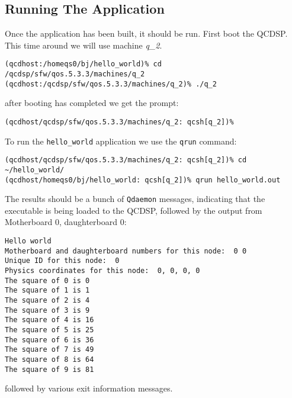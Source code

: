 \subsection{Running The Application}
Once the application has been built, it should be run.
First boot the QCDSP. This time around we will use machine {\em q\_2}.
\begin{verbatim}
(qcdhost:/homeqs0/bj/hello_world)% cd /qcdsp/sfw/qos.5.3.3/machines/q_2
(qcdhost:/qcdsp/sfw/qos.5.3.3/machines/q_2)% ./q_2
\end{verbatim}
after booting has completed we get the prompt:
\begin{verbatim}
(qcdhost/qcdsp/sfw/qos.5.3.3/machines/q_2: qcsh[q_2])% 
\end{verbatim}

To run the {\tt hello\_world} application we use the {\tt qrun} 
command:
\begin{verbatim}
(qcdhost/qcdsp/sfw/qos.5.3.3/machines/q_2: qcsh[q_2])% cd ~/hello_world/
(qcdhost/homeqs0/bj/hello_world: qcsh[q_2])% qrun hello_world.out
\end{verbatim}
The results should be a bunch of {\tt Qdaemon} messages,
indicating that the executable is being loaded to the 
QCDSP, followed by the output from Motherboard 0,
daughterboard 0:
\begin{verbatim}
Hello world
Motherboard and daughterboard numbers for this node:  0 0
Unique ID for this node:  0
Physics coordinates for this node:  0, 0, 0, 0
The square of 0 is 0
The square of 1 is 1
The square of 2 is 4
The square of 3 is 9
The square of 4 is 16
The square of 5 is 25
The square of 6 is 36
The square of 7 is 49
The square of 8 is 64
The square of 9 is 81
\end{verbatim}
followed by various exit information messages.

